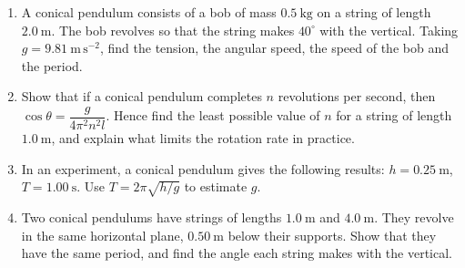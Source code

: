 \documentclass[11pt]{article}
\begin{document}
\begin{exercice}[Practice]
\begin{enumerate}
\item A conical pendulum consists of a bob of mass $0.5\ \mathrm{kg}$ on a string of length $2.0\ \mathrm{m}$. The bob revolves so that the string makes $40^{\circ}$ with the vertical. Taking $g = 9.81\ \mathrm{m\,s^{-2}}$, find the tension, the angular speed, the speed of the bob and the period.
\item Show that if a conical pendulum completes $n$ revolutions per second, then $\cos\theta = \dfrac{g}{4\pi^{2}n^{2}l}$. Hence find the least possible value of $n$ for a string of length $1.0\ \mathrm{m}$, and explain what limits the rotation rate in practice.
\item In an experiment, a conical pendulum gives the following results: $h = 0.25\ \mathrm{m}$, $T = 1.00\ \mathrm{s}$. Use $T = 2\pi\sqrt{h/g}$ to estimate $g$.
\item Two conical pendulums have strings of lengths $1.0\ \mathrm{m}$ and $4.0\ \mathrm{m}$. They revolve in the same horizontal plane, $0.50\ \mathrm{m}$ below their supports. Show that they have the same period, and find the angle each string makes with the vertical.
\end{enumerate}
\end{exercice}
\end{document}
